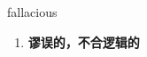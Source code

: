 
\begin{frame}
{\huge fallacious}
\begin{center}
\begin{enumerate}\Large
  \item \textbf{谬误的，不合逻辑的}
\end{enumerate}
\end{center}
\end{frame}
